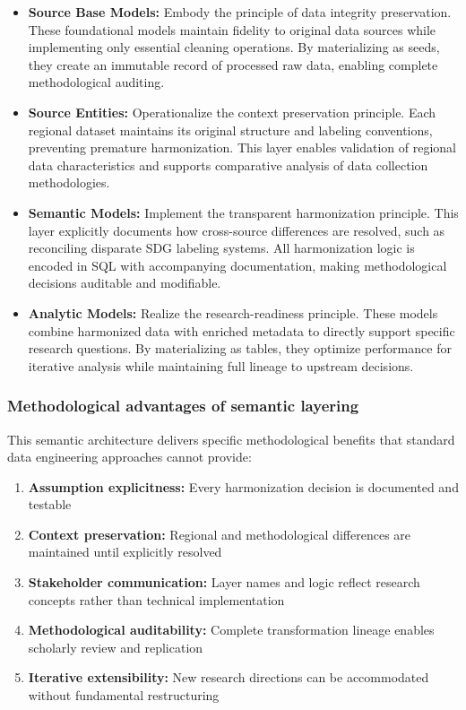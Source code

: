\documentclass{article}
\begin{document}
\begin{itemize}
    \item \textbf{Source Base Models:} Embody the principle of data integrity preservation. These foundational models maintain fidelity to original data sources while implementing only essential cleaning operations. By materializing as seeds, they create an immutable record of processed raw data, enabling complete methodological auditing.

    \item \textbf{Source Entities:} Operationalize the context preservation principle. Each regional dataset maintains its original structure and labeling conventions, preventing premature harmonization. This layer enables validation of regional data characteristics and supports comparative analysis of data collection methodologies.
    
    \item \textbf{Semantic Models:} Implement the transparent harmonization principle. This layer explicitly documents how cross-source differences are resolved, such as reconciling disparate SDG labeling systems. All harmonization logic is encoded in SQL with accompanying documentation, making methodological decisions auditable and modifiable.
    
    \item \textbf{Analytic Models:} Realize the research-readiness principle. These models combine harmonized data with enriched metadata to directly support specific research questions. By materializing as tables, they optimize performance for iterative analysis while maintaining full lineage to upstream decisions.
\end{itemize}

\subsubsection{Methodological advantages of semantic layering}

This semantic architecture delivers specific methodological benefits that standard data engineering approaches cannot provide:

\begin{enumerate}
    \item \textbf{Assumption explicitness:} Every harmonization decision is documented and testable
    \item \textbf{Context preservation:} Regional and methodological differences are maintained until explicitly resolved
    \item \textbf{Stakeholder communication:} Layer names and logic reflect research concepts rather than technical implementation
    \item \textbf{Methodological auditability:} Complete transformation lineage enables scholarly review and replication
    \item \textbf{Iterative extensibility:} New research directions can be accommodated without fundamental restructuring
\end{enumerate}
\end{document}
